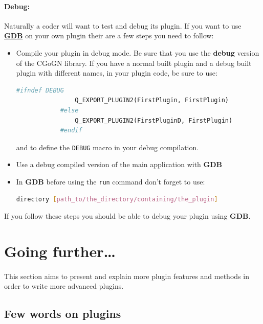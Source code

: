 \documentclass[a4paper]{scrreprt}
\begin{document}
	\paragraph{Debug:}
	Naturally a coder will want to test and debug its plugin. If you want to use
	\href{http://www.gnu.org/software/gdb/}{\textbf{GDB}} on your own plugin their
	are a few steps you need to follow:
	\begin{itemize}
	  \item Compile your plugin in debug mode. Be sure that you use the
	  \textbf{debug} version of the CGoGN library. If you have a normal built
	  plugin and a debug built plugin with different names, in your plugin code, be
	  sure to use:
	  \begin{lstlisting}[language=make]
			#ifndef DEBUG
				Q_EXPORT_PLUGIN2(FirstPlugin, FirstPlugin)
			#else
				Q_EXPORT_PLUGIN2(FirstPluginD, FirstPlugin)
			#endif
	  \end{lstlisting}
	  and to define the \texttt{DEBUG} macro in your debug compilation.
	  \item Use a debug compiled version of the main application with \textbf{GDB}
	  \item In \textbf{GDB} before using the \texttt{run} command don't forget to
	  use:
	  \begin{lstlisting}[language=bash]
	  		directory [path_to/the_directory/containing/the_plugin]
	  \end{lstlisting}	  
	\end{itemize}
	If you follow these steps you should be able to debug your plugin using
	\textbf{GDB}.
	
	
\section{Going further\ldots}
	\paragraph{}
	This section aims to present and explain more plugin features and methods in
	order to write more advanced plugins.
	
	\FloatBarrier
\subsection{Few words on plugins}
\end{document}

